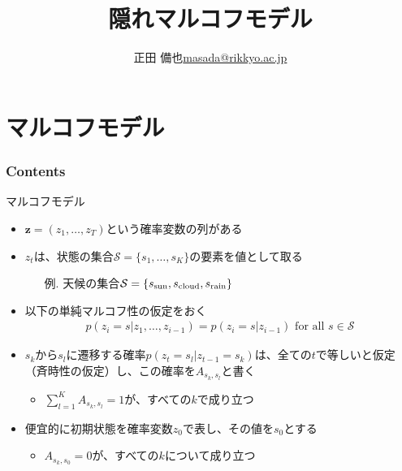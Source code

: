 \documentclass[aspectratio=169,unicode,dvipdfmx,14pt]{beamer}
\title{ \\隠れマルコフモデル}
\author{\texorpdfstring{正田 備也\newline\href{mailto:masada@rikkyo.ac.jp}{masada@rikkyo.ac.jp}}{正田 備也}}
\date{}
\begin{document}
\begin{frame}
\titlepage
\end{frame}

\section{マルコフモデル}

\begin{frame}\frametitle{Contents}
\Large \tableofcontents[currentsection]
\end{frame}

\begin{frame}{マルコフモデル}
\begin{itemize}
\item $\bm{z} = (z_1,\ldots,z_T)$という確率変数の列がある
\item $z_t$は、状態の集合$\mathcal{S} = \{ s_1, \ldots, s_K \}$の要素を値として取る
\begin{itemize}
\item[例.] 天候の集合$\mathcal{S} = \{ s_{\mbox{\scriptsize sun}}, s_{\mbox{\scriptsize cloud}}, s_{\mbox{\scriptsize rain}} \}$
\end{itemize}
\item 以下の単純マルコフ性の仮定をおく
\vspace{-.1in}
\begin{align}
p(z_i =s | z_1,\ldots, z_{i-1}) = p(z_i =s | z_{i-1}) \mbox{ for all $s \in \mathcal{S}$}
\end{align}
\item $s_k$から$s_l$に遷移する確率$p(z_t=s_l|z_{t-1}=s_k)$は、全ての$t$で等しいと仮定（斉時性の仮定）し、この確率を$A_{s_k,s_l}$と書く
\begin{itemize}
\item $\sum_{l=1}^K A_{s_k, s_l} = 1$が、すべての$k$で成り立つ
\end{itemize}
\item 便宜的に初期状態を確率変数$z_0$で表し、その値を$s_0$とする
\begin{itemize}
\item $A_{s_k,s_0} = 0$が、すべての$k$について成り立つ
\end{itemize}
\end{itemize}
\end{frame}
\end{document}
